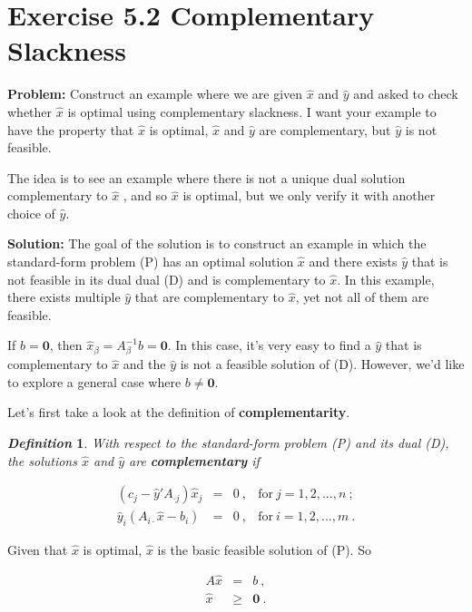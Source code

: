 \section{Exercise 5.2 Complementary Slackness}
\textbf{Problem:} Construct an example where we are given $\hat{x}$ and $\hat{y}$ and asked to check whether $\hat{x}$ is optimal using complementary slackness. I want your example to have the property that $\hat{x}$ is optimal, $\hat{x}$ and $\hat{y}$ are complementary, but $\hat{y}$ is not feasible.

The idea is to see an example where there is not a unique dual solution complementary
to $\hat{x}$ , and so $\hat{x}$ is optimal, but we only verify it with another choice of $\hat{y}$.

\textbf{Solution:} The goal of the solution is to construct an example in which the standard-form problem (P) has an optimal solution $\hat{x}$ and there exists $\hat{y}$ that is not feasible in its dual dual (D) and is complementary to $\hat{x}$. In this example, there exists multiple $\hat{y}$ that are complementary to $\hat{x}$, yet not all of them are feasible. 

If $b=\mathbf{0}$, then $\hat{x}_\beta = A_\beta^{-1}b = \mathbf{0}$. In this case, it's very easy to find a $\hat{y}$ that is complementary to $\hat{x}$ and the $\hat{y}$ is not a feasible solution of (D). However, we'd like to explore a general case where $b\neq\mathbf{0}$.

Let's first take a look at the definition of \textbf{complementarity}.

\newtheorem{mydef}{\emph{\textbf{Definition}}}
\begin{mydef}
With respect to the standard-form problem (P) and its dual (D), the solutions $\hat{x}$ and $\hat{y}$ are \textbf{complementary} if 

\[
\begin{array}{rccl}
 (c_j-\hat{y}'A_{\cdot j})\hat{x}_j &  = & 0~,& \text{for}~j=1,2,...,n ~; \\
 \hat{y}_i(A_{i\cdot}\hat{x}-b_i) & = & 0~, & \text{for}~i=1,2,...,m ~.
\end{array}
\]

\end{mydef}

Given that $\hat{x}$ is optimal, $\hat{x}$ is the basic feasible solution of (P). So

\[
\begin{array}{rcl}
 A\hat{x} &=& b~, \\
 \hat{x} &\geq& \mathbf{0}~.
\end{array}
\]

